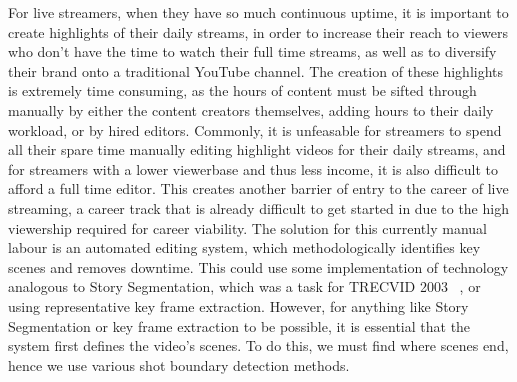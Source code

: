 \documentclass[12pt]{article}
\begin{document}
    For live streamers, when they have so much continuous uptime, it is important to create highlights of their daily streams, in order to increase their reach to viewers who
don't have the time to watch their full time streams, as well as to diversify their brand onto a traditional YouTube channel. The creation of these highlights is extremely
time consuming, as the hours of content must be sifted through manually by either the content creators themselves, adding hours to their daily workload, or by hired editors. 
Commonly, it is unfeasable for streamers to spend all their spare time manually editing highlight videos for their daily streams, and for streamers with a lower viewerbase
and thus less income, it is also difficult to afford a full time editor. This creates another barrier of entry to the career of live streaming, a career track that is already
difficult to get started in due to the high viewership required for career viability. The solution for this currently manual labour is an automated editing system, which 
methodologically identifies key scenes and removes downtime. This could use some implementation of technology analogous to Story Segmentation, which was a task for TRECVID 2003
~\cite{storyseg}, or using representative key frame extraction. However, for anything like Story Segmentation or key frame extraction to be possible, it is essential that the
system first defines the video's scenes. To do this, we must find where scenes end, hence we use various shot boundary detection methods. 
\end{document}
